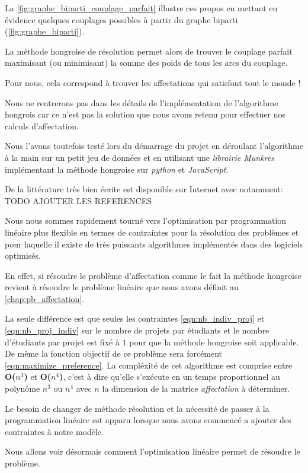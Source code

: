 \documentclass[final,poster]{polytech/polytech}
\begin{document}
La \autoref{fig:graphe_biparti_couplage_parfait} illustre ces propos en mettant en évidence quelques couplages possibles à partir du graphe biparti (\autoref{fig:graphe_biparti}).

La méthode hongroise de résolution permet alors de trouver le couplage parfait maximisant (ou minimisant) la somme des poids de tous les arcs du couplage.

Pour nous, cela correspond à trouver les affectations qui satisfont tout le monde ! 

Nous ne rentrerons pas dans les détails de l'implémentation de l'algorithme hongrois car ce n'est pas la solution que nous avons retenu pour effectuer nos calculs d'affectation. 

Nous l'avons toutefois testé lors du démarrage du projet en déroulant l'algorithme à la main sur un petit jeu de données et en utilisant une \textit{librairie Munkres} implémentant la méthode hongroise sur \textit{python} et \textit{JavaScript}.

De la littérature très bien écrite est disponible sur Internet avec notamment: TODO AJOUTER LES REFERENCES

Nous nous sommes rapidement tourné vers l'optimisation par programmation linéaire plus flexible en termes de contraintes pour la résolution des problèmes et pour laquelle il existe de très puissants algorithmes implémentés dans des logiciels optimisés.

En effet, si résoudre le problème d'affectation comme le fait la méthode hongroise revient à résoudre le problème linéaire que nous avons définit au \autoref{chap:pb_affectation}.

La seule différence est que seules les contraintes \autoref{eqn:nb_indiv_proj} et \autoref{eqn:nb_proj_indiv} sur le nombre de projets par étudiants et le nombre d'étudiants par projet est fixé à $1$ pour que la méthode hongroise soit applicable.
De même la fonction objectif de ce problème sera forcément \autoref{eqn:maximize_preference}. La compléxité de cet algorithme est comprise entre \textbf{O($n^3$)} et  \textbf{O($n^4$)}, c'est à dire qu'elle s'exécute en un temps proportionnel au polynôme $n^3$ ou $n^4$ avec $n$ la dimension de la matrice \textit{affectation} à déterminer.

Le besoin de changer de méthode résolution et la nécessité de passer à la programmation linéaire est apparu lorsque nous avons commencé a ajouter des contraintes à notre modèle.

Nous allons voir désormais comment l'optimisation linéaire permet de résoudre le problème.
\end{document}
